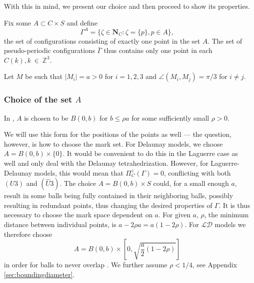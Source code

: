 With this in mind, we present our choice and then proceed to show its properties.\newline 

\noindent Fix some $A \subset C\times S$ and define
$$\Gamma^A = \{\zeta \in \mathbf N_C: \zeta = \{p\}, p \in A\},$$
the set of configurations consisting of exactly one point in the set $A$. The set of pseudo-periodic configurations $\bar\Gamma$ thus contains only one point in each $C(k), k~\in~\mathbb Z^3$.

Let $M$ be such that $|M_i| = a > 0$ for $i=1,2,3$ and $\angle(M_i,M_j) = \pi / 3$ for $i\neq j$.

\subsubsection{Choice of the set $A$}
In \cite{DDG12}, $A$ is chosen to be $B(0,b)$ for $b\leq \rho a$ for some sufficiently small $\rho >0$. 

We will use this form for the positions of the points as well --- the question, however, is how to choose the mark set. For Delaunay models, we choose $A=B(0,b)\times\{0\}$. It would be convenient to do this in the Laguerre case as well and only deal with the Delaunay tetrahedrization. However, for Laguerre-Delaunay models, this  would mean that $\Pi^z_C(\Gamma) = 0$, conflicting with both $(U3)$ and $(\hat U3)$. The choice $A=B(0,b)\times S$ could, for a small enough $a$, result in some balls being fully contained in their neighboring balls, possibly resulting in redundant points, thus changing the desired properties of $\Gamma$. It is thus necessary to choose the mark space dependent on $a$. For given $a$, $\rho$, the minimum distance between individual points, is $a-2\rho a = a(1-2\rho)$. For $\mathcal {LD}$ models we therefore choose 
\begin{equation}\label{eq:choiceA} A = B(0,b)\times \left[0, \sqrt{\frac a2(1-2\rho)}\right] \end{equation}
in order for balls to never overlap . We further assume $\rho < 1/4$, see Appendix \ref{sec:boundingdiameter}.




